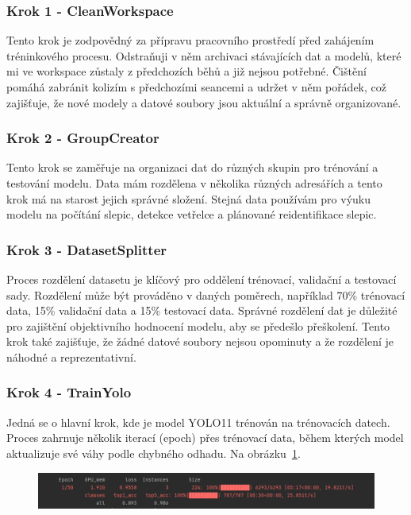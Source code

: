 \subsubsection*{Krok 1 - CleanWorkspace}
Tento krok je zodpovědný za přípravu pracovního prostředí před zahájením tréninkového procesu.
Odstraňuji v něm archivaci stávajících dat a modelů, které mi ve workspace zůstaly z předchozích běhů a již nejsou potřebné.
Čištění pomáhá zabránit kolizím s předchozími seancemi a udržet v něm pořádek, což zajišťuje, že nové modely a datové soubory jsou aktuální a správně organizované.

\subsubsection*{Krok 2 - GroupCreator}

Tento krok se zaměřuje na organizaci dat do různých skupin pro trénování a testování modelu.
Data mám rozdělena v několika různých adresářích a tento krok má na starost jejich správné složení.
Stejná data používám pro výuku modelu na počítání slepic, detekce vetřelce a plánované reidentifikace slepic.

\subsubsection*{Krok 3 - DatasetSplitter}

Proces rozdělení datasetu je klíčový pro oddělení trénovací, validační a testovací sady.
Rozdělení může být prováděno v daných poměrech, například 70\% trénovací data, 15\% validační data a 15\% testovací data.
Správné rozdělení dat je důležité pro zajištění objektivního hodnocení modelu, aby se předešlo přeškolení.
Tento krok také zajišťuje, že žádné datové soubory nejsou opominuty a že rozdělení je náhodné a reprezentativní.

\subsubsection*{Krok 4 - TrainYolo}

Jedná se o hlavní krok, kde je model YOLO11 trénován na trénovacích datech.
Proces zahrnuje několik iterací (epoch) přes trénovací data, během kterých model aktualizuje své váhy podle chybného odhadu.
Na obrázku~\ref{fig:train_yolo}.


\begin{figure}[htbp]
    \centering
    \includegraphics[width=1.0\textwidth]{img/train_yolo}
    \label{fig:train_yolo}
\end{figure}

